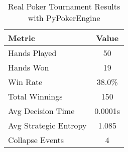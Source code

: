 \begin{table}[h]
\centering
\caption{Real Poker Tournament Results with PyPokerEngine}
\begin{tabular}{|l|c|}
\hline
Metric & Value \\
\hline
Hands Played & 50 \\
Hands Won & 19 \\
Win Rate & 38.0\% \\
Total Winnings & 150 \\
Avg Decision Time & 0.0001s \\
Avg Strategic Entropy & 1.085 \\
Collapse Events & 4 \\
\hline
\end{tabular}
\end{table}